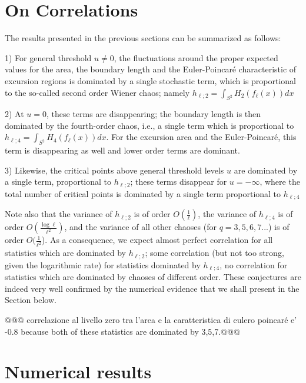 \documentclass[aps,prd,showpacs,superscriptaddress,groupedaddress]{revtex4-1}  %
\begin{document}
\section{On Correlations}

The results presented in the previous sections can be summarized as follows:

1) For general threshold $u \neq 0$, the fluctuations around the proper expected values for the area, the boundary length and the Euler-Poincar\'e characteristic of excursion regions is dominated by a single stochastic term, which is proportional to the so-called second order Wiener chaos; namely $h_{\ell;2}=\int_{S^2} H_2(f_{\ell}(x))dx$


2) At $u=0$, these terms are disappearing; the boundary length is then dominated by the fourth-order chaos, i.e., a single term which is proportional to $h_{\ell;4}=\int_{S^2} H_4(f_{\ell}(x))dx$. For the excursion area and the Euler-Poincar\'e, this term is disappearing as well and lower order terms are dominant. 


3) Likewise, the critical points above general threshold levels $u$ are dominated by a single term, proportional to $h_{\ell;2}$; these terms disappear for $u=-\infty$, where the total number of critical points is dominated by a single term proportional to $h_{\ell;4}$  

Note also that the variance of $h_{\ell;2}$ is of order $O(\frac{1}{\ell})$, the variance of $h_{\ell;4}$ is of order $O(\frac{\log\ell}{\ell^2})$, and the variance of all other chaoses (for $q=3,5,6,7...$) is of order $O(\frac{1}{\ell^2}$). As a consequence, we expect almost perfect correlation for all statistics which are dominated by $h_{\ell;2}$; some correlation (but not too strong, given the logarithmic rate) for statistics dominated by $h_{\ell;4}$, no correlation for statistics which are dominated by chaoses of different order. These conjectures are indeed very well confirmed by the numerical evidence that we shall present in the Section below.

@@@ correlazione al livello zero tra l'area e la caratteristica di eulero poincar\'e e' -0.8 because both of these statistics are dominated by 3,5,7.@@@


\section{Numerical results}\label{sec:numerical}
\end{document}
